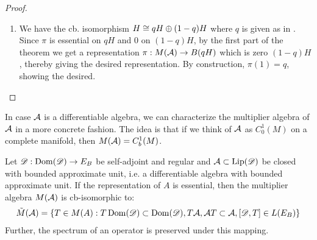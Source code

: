 \begin{proof}
\begin{enumerate}
	\item
		We have the cb. isomorphism $H\cong qH\oplus (1-q)H$ where $q$ is given as in . Since $\pi$ is essential on $qH$ and $0$ on $(1-q)H$, by the first part of the theorem we get a representation $\pi:M(\mathcal{A})\to B(qH)$ which is zero $(1-q)H$, thereby giving the desired representation. By construction, $\pi(1)=q$, showing the desired.
	\end{enumerate}
\end{proof}
In case $\mathcal{A}$ is a differentiable algebra, we can characterize the multiplier algebra of $\mathcal{A}$ in a more concrete fashion. The idea is that if we think of $\mathcal{A}$ as $C_0^1(M)$ on a complete manifold, then $M(\mathcal{A})=C_b^1(M)$. 
\begin{proposition}\label{mesrennie117}
	Let $\mathscr{D}:\operatorname{Dom}(\mathscr{D})\to E_B$ be self-adjoint and regular and $\mathcal{A}\subset \operatorname{Lip}(\mathscr{D})$ be closed with bounded approximate unit, i.e. a differentiable algebra with bounded approximate unit. If the representation of $A$ is essential, then the multiplier algebra $M(\mathcal{A})$ is cb-isomorphic to:
	\begin{align*}
		\tilde{M}(\mathcal{A})=\{T\in M(A) : T\operatorname{Dom}(\mathscr{D})\subset \operatorname{Dom}(\mathscr{D}),T\mathcal{A},\mathcal{A} T\subset \mathcal{A},[\mathscr{D},T]\in L(E_B)\}
	\end{align*}
	Further, the spectrum of an operator is preserved under this mapping. 
\end{proposition}
